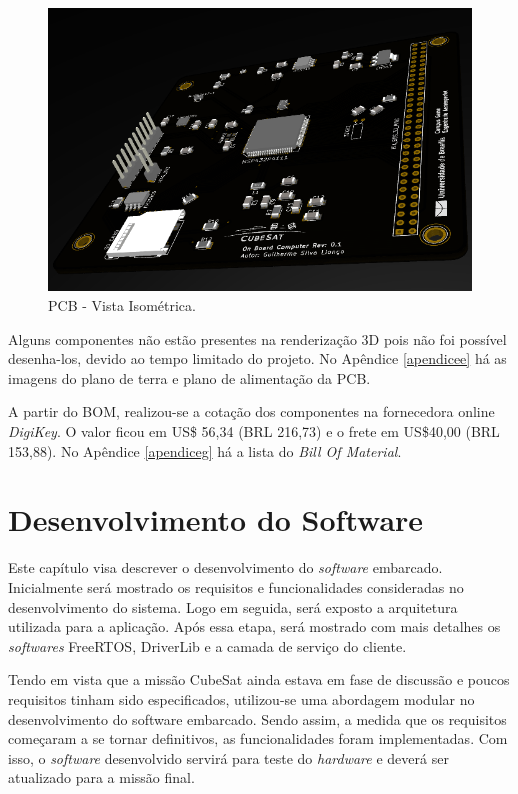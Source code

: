 \begin{figure}[h]
	\centering
	
	
	\includegraphics[keepaspectratio=true,scale=0.78]{figuras/pcbRealistic.PNG}
	\caption{PCB - Vista Isométrica.}
	\label{pcb_isoView}
\end{figure}
\FloatBarrier
Alguns componentes não estão presentes na renderização 3D pois não foi possível desenha-los, devido ao tempo limitado do projeto. No Apêndice \ref{apendicee} há as imagens do plano de terra e plano de alimentação da PCB.

A partir do BOM, realizou-se a cotação dos componentes na fornecedora online \textit{DigiKey}. O valor ficou em US\$ 56,34 (BRL 216,73) e o frete em US\$40,00 (BRL 153,88). No Apêndice \ref{apendiceg} há a lista do \textit{Bill Of Material}. 


\chapter[Desenvolvimento do Software]{Desenvolvimento do Software}

Este capítulo visa descrever o desenvolvimento do \textit{software} embarcado. Inicialmente será mostrado os requisitos e funcionalidades consideradas no desenvolvimento do sistema. Logo em seguida, será exposto a arquitetura utilizada para a aplicação. Após essa etapa, será mostrado com mais detalhes os \textit{softwares} FreeRTOS, DriverLib e a camada de serviço do cliente. 

Tendo em vista que a missão CubeSat ainda estava em fase de discussão e poucos requisitos tinham sido especificados, utilizou-se uma abordagem modular no desenvolvimento do software embarcado. Sendo assim, a medida que os requisitos começaram a se tornar definitivos, as funcionalidades foram implementadas. Com isso, o \textit{software} desenvolvido servirá para teste do \textit{hardware} e deverá ser atualizado para a missão final.

